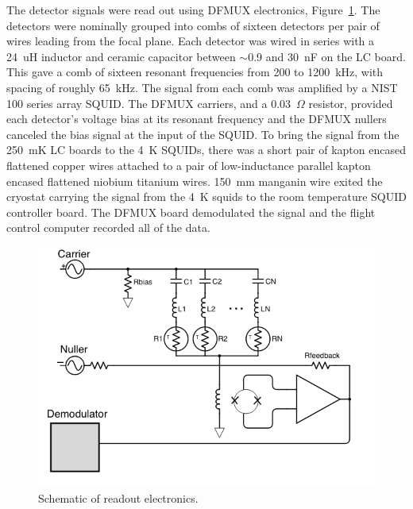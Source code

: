 The detector signals were read out using \ac{DFMUX} electronics, Figure~\ref{fig:dfmux}.
The detectors were nominally grouped into combs of sixteen detectors per pair of wires leading from the focal plane. 
Each detector was wired in series with a 24~uH inductor and ceramic capacitor between $\sim$0.9 and 30~nF on the \ac{LC} board. 
This gave a comb of sixteen resonant frequencies from 200 to 1200~kHz, with spacing of roughly 65~kHz. 
The signal from each comb was amplified by a NIST 100 series array \ac{SQUID}. 
The \ac{DFMUX} carriers, and a 0.03~$\Omega$ resistor, provided each detector's voltage bias at its resonant frequency and the \ac{DFMUX} nullers canceled the bias signal at the input of the \ac{SQUID}. 
To bring the signal from the 250~mK \ac{LC} boards to the 4~K \ac{SQUID}s, there was a short pair of kapton encased flattened copper wires attached to a pair of low-inductance parallel kapton encased flattened niobium titanium wires.
150~mm manganin wire exited the cryostat carrying the signal from the 4~K squids to the room temperature \ac{SQUID} controller board. 
The \ac{DFMUX} board demodulated the signal and the flight control computer recorded all of the data. 


\begin{figure}[htbp]
\begin{center}
\includegraphics[width=0.6\columnwidth]{figures/dfmux_schematic.png}
\caption[DFMUX schematic]{Schematic of readout electronics. 
\label{fig:dfmux} }
\end{center}
\end{figure}


